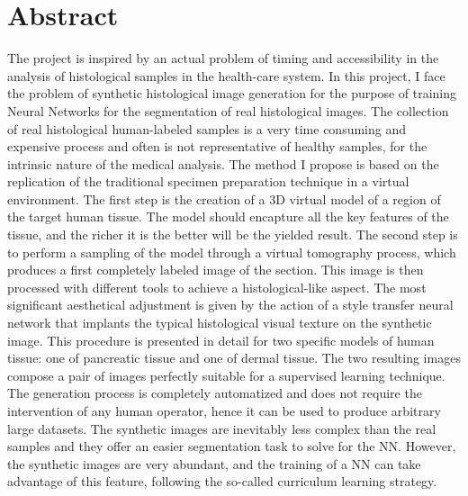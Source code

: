 \chapter*{Abstract}
The project is inspired by an actual problem of timing and accessibility in the analysis of histological samples in the health-care system. In this project, I face the problem of synthetic histological image generation for the purpose of training Neural Networks for the segmentation of real histological images. The collection of real histological human-labeled samples is a very time consuming and expensive process and often is not representative of healthy samples, for the intrinsic nature of the medical analysis. The method I propose is based on the replication of the traditional specimen preparation technique in a virtual environment. The first step is the creation of a 3D virtual model of a region of the target human tissue. The model should encapture all the key features of the tissue, and the richer it is the better will be the yielded result. The second step is to perform a sampling of the model through a virtual tomography process, which produces a first completely labeled image of the section. This image is then processed with different tools to achieve a histological-like aspect. The most significant aesthetical adjustment is given by the action of a style transfer neural network that implants the typical histological visual texture on the synthetic image. This procedure is presented in detail for two specific models of human tissue: one of pancreatic tissue and one of dermal tissue. The two resulting images compose a pair of images perfectly suitable for a supervised learning technique. The generation process is completely automatized and does not require the intervention of any human operator, hence it can be used to produce arbitrary large datasets. The synthetic images are inevitably less complex than the real samples and they offer an easier segmentation task to solve for the NN. However, the synthetic images are very abundant, and the training of a NN can take advantage of this feature, following the so-called curriculum learning strategy.
